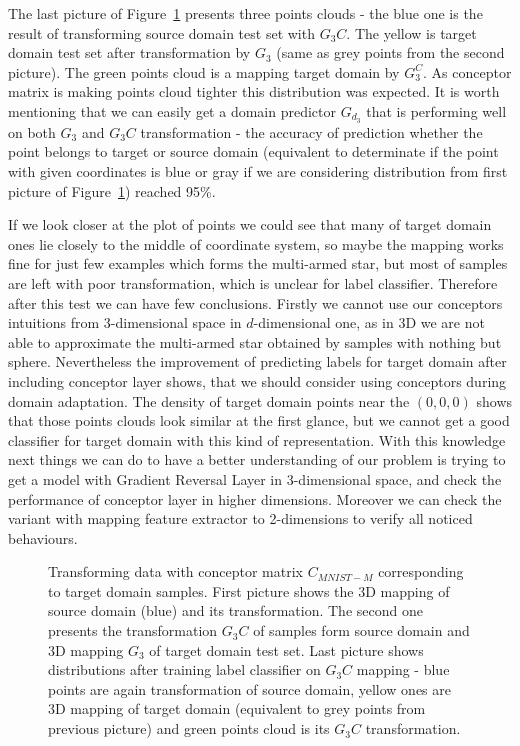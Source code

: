 \documentclass{article}
\begin{document}
\par
The last picture of Figure~\ref{fig:ConceptorMnist} presents three points clouds - the blue one is the result of transforming source domain test set with $G_{3}C$. The yellow is target domain test set after transformation by $G_{3}$ (same as grey points from the second picture). The green points cloud is a mapping target domain by $G_{3}^{C}$. As conceptor matrix is making points cloud tighter this distribution was expected. It is worth mentioning that we can easily get a domain predictor $G_{d_{3}}$ that is performing well on both $G_{3}$ and $G_{3}C$ transformation - the accuracy of prediction whether the point belongs to target or source domain (equivalent to determinate if the point with given coordinates is blue or gray if we are considering distribution from first picture of Figure~\ref{fig:ConceptorMnist}) reached 95\%.
\par
If we look closer at the plot of points we could see that many of target domain ones lie closely to the middle of coordinate system, so maybe the mapping works fine for just few examples which forms the multi-armed star, but most of samples are left with poor transformation, which is unclear for label classifier. Therefore after this test we can have few conclusions. Firstly we cannot use our conceptors intuitions from 3-dimensional space in $d$-dimensional one, as in 3D we are not able to approximate the multi-armed star obtained by samples with nothing but sphere. Nevertheless the improvement of predicting labels for target domain after including conceptor layer shows, that we should consider using conceptors during domain adaptation. The density of target domain points near the $(0,0,0)$ shows that those points clouds look similar at the first glance, but we cannot get a good classifier for target domain with this kind of representation. With this knowledge next things we can do to have a better understanding of our problem is trying to get a model with Gradient Reversal Layer in 3-dimensional space, and check the performance of conceptor layer in higher dimensions. Moreover we can check the variant with mapping feature extractor to 2-dimensions to verify all noticed behaviours. 

\begin{figure}[htb]%
\captionsetup[subfigure]{labelformat=empty}
    \centering
    \qquad
    \qquad
    \caption{Transforming data with conceptor matrix $C_{MNIST-M}$ corresponding to target domain samples. First picture shows the 3D mapping of source domain (blue) and its transformation. The second one presents the transformation $G_{3}C$ of samples form source domain and 3D mapping $G_{3}$ of target domain test set. Last picture shows distributions after training label classifier on $G_{3}C$ mapping - blue points are again transformation of source domain, yellow ones are 3D mapping of target domain (equivalent to grey points from previous picture) and green points cloud is its $G_{3}C$ transformation.}%
    \label{fig:ConceptorMnist}%
\end{figure}
\end{document}
